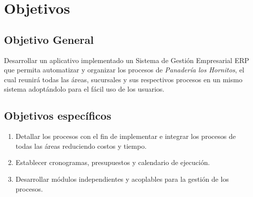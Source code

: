 \chapter{Objetivos}
\section{Objetivo General}
Desarrollar un aplicativo implementado un Sistema de Gesti\'on Empresarial ERP que permita automatizar y organizar los procesos de \emph{Panader\'ia los Hornitos}, el cual reunir\'a todas las \'areas, sucursales y sus respectivos procesos en un mismo sistema adopt\'andolo para el f\'acil uso de los usuarios.%
\section{Objetivos espec\'ificos}
\begin{enumerate}
\item Detallar los procesos con el fin de implementar e integrar los procesos de todas las \'areas reduciendo costos y tiempo.%
\item Establecer cronogramas, presupuestos y calendario de ejecuci\'on.
\item Desarrollar m\'odulos independientes y acoplables para la gesti\'on de los procesos.
\end{enumerate}